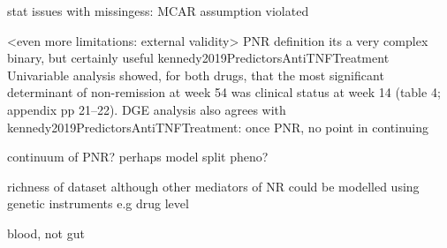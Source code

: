 \begin{outline}
    \2 stat issues with missingess: MCAR assumption violated


\1 <even more limitations: external validity>
    \2 PNR definition
        \3 its a very complex binary, but certainly useful
        \3 kennedy2019PredictorsAntiTNFTreatment Univariable analysis showed, for both drugs, that the most significant determinant of non-remission at week 54 was clinical status at week 14 (table 4; appendix pp 21–22).
        \3 DGE analysis also agrees with kennedy2019PredictorsAntiTNFTreatment: once PNR, no point in continuing

        \3 continuum of PNR? perhaps model split pheno?

        richness of dataset 
        although
        other mediators of NR could be modelled using genetic instruments e.g drug level

    \2 blood, not gut




\end{outline}
